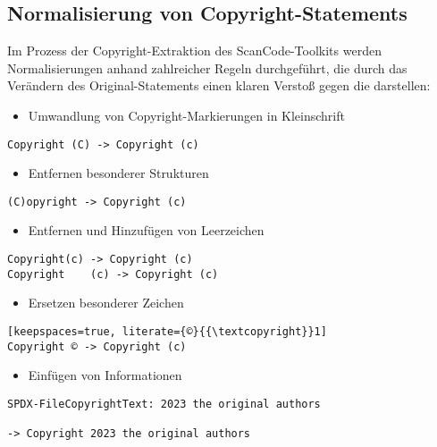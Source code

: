 
\subsection{Normalisierung von Copyright-Statements}

Im Prozess der Copyright-Extraktion des ScanCode-Toolkits werden Normalisierungen anhand zahlreicher Regeln durchgeführt, die durch das Verändern des Original-Statements einen klaren Verstoß gegen die  darstellen:

\begin{itemize}
    \item Umwandlung von Copyright-Markierungen in Kleinschrift
\end{itemize}
\begin{lstlisting}[keepspaces=true]
Copyright (C) -> Copyright (c)
\end{lstlisting}

\begin{itemize}
    \item Entfernen besonderer Strukturen
\end{itemize}
\begin{lstlisting}[keepspaces=true]
(C)opyright -> Copyright (c)
\end{lstlisting}

\begin{itemize}
    \item Entfernen und Hinzufügen von Leerzeichen
\end{itemize}
\begin{lstlisting}[keepspaces=true]
Copyright(c) -> Copyright (c)
Copyright    (c) -> Copyright (c)
\end{lstlisting}

\begin{itemize}
    \item Ersetzen besonderer Zeichen
\end{itemize}
\begin{lstlisting}[keepspaces=true, literate={©}{{\textcopyright}}1]
Copyright © -> Copyright (c)
\end{lstlisting}

\begin{itemize}
    \item Einfügen von Informationen
\end{itemize}
\begin{lstlisting}[keepspaces=true]
SPDX-FileCopyrightText: 2023 the original authors

-> Copyright 2023 the original authors
\end{lstlisting}


